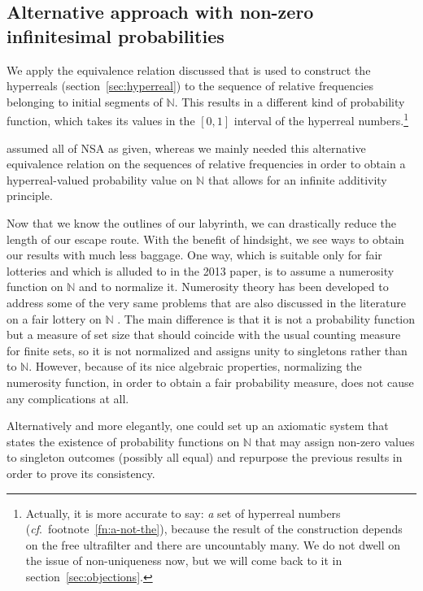 \subsection{Alternative approach with non-zero infinitesimal probabilities}\label{sec:alternative}
We apply the equivalence relation discussed that is used to construct the hyperreals (section~\ref{sec:hyperreal}) to the sequence of relative frequencies belonging to initial segments of $\mathbb{N}$. This results in a different kind of probability function, which takes its values in the $[0,1]$ interval of the hyperreal numbers.\footnote{Actually, it is more accurate to say: \emph{a} set of hyperreal numbers (\textit{cf}.\ footnote~\ref{fn:a-not-the}), because the result of the construction depends on the free ultrafilter and there are uncountably many. We do not dwell on the issue of non-uniqueness now, but we will come back to it in section~\ref{sec:objections}.}

\citet{WenmackersHorsten:2013} assumed all of NSA as given, whereas we mainly needed this alternative equivalence relation on the sequences of relative frequencies in order to obtain a hyperreal-valued probability value on $\mathbb{N}$ that allows for an infinite additivity principle.

Now that we know the outlines of our labyrinth, we can drastically reduce the length of our escape route.
With the benefit of hindsight, we see ways to obtain our results with much less baggage. One way, which is suitable only for fair lotteries and which is alluded to in the 2013 paper, is to assume a numerosity function on $\mathbb{N}$ and to normalize it. Numerosity theory has been developed to address some of the very same problems that are also discussed in the literature on a fair lottery on $\mathbb{N}$ \citep{BenciDiNasso:2003b,Mancosu:2009}. The main difference is that it is not a probability function but a measure of set size that should coincide with the usual counting measure for finite sets, so it is not normalized and assigns unity to singletons rather than to $\mathbb{N}$. However, because of its nice algebraic properties, normalizing the numerosity function, in order to obtain a fair probability measure, does not cause any complications at all.

Alternatively and more elegantly, one could set up an axiomatic system that states the existence of probability functions on $\mathbb{N}$ that may assign non-zero values to singleton outcomes (possibly all equal) and repurpose the previous results in order to prove its consistency.

